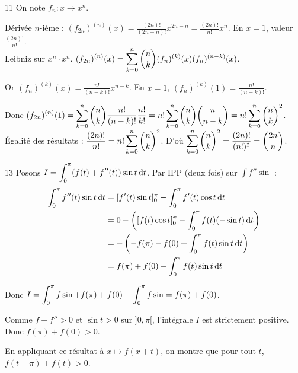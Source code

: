 \begin{correction}{11}
    On note $f_n: x \to x^n$.

    Dérivée $n$-ième : $(f_{2n})^{(n)}(x) = \frac{(2n)!}{(2n-n)!} x^{2n-n} = \frac{(2n)!}{n!} x^n$.
    En $x=1$, valeur $\frac{(2n)!}{n!}$. \\
    
    Leibniz sur $x^n \cdot x^n$.
    $\displaystyle(f_{2n})^{(n)}(x) = \sum_{k=0}^n \binom{n}{k} (f_n)^{(k)}(x) (f_n)^{(n-k)}(x)$.

    Or $(f_n)^{(k)}(x) = \frac{n!}{(n-k)!} x^{n-k}$.
    En $x=1$, $(f_n)^{(k)}(1) = \frac{n!}{(n-k)!}$.

    Donc $\displaystyle (f_{2n})^{(n)}(1) = \sum_{k=0}^n \binom{n}{k} \frac{n!}{(n-k)!} \frac{n!}{k!} = n! \sum_{k=0}^n \binom{n}{k} \binom{n}{n-k} = n! \sum_{k=0}^n \binom{n}{k}^2$. \\

    Égalité des résultats : $\displaystyle \frac{(2n)!}{n!} = n! \sum_{k=0}^n \binom{n}{k}^2$.
    D'où $\displaystyle \sum_{k=0}^n \binom{n}{k}^2 = \frac{(2n)!}{(n!)^2} = \binom{2n}{n}$.
\end{correction}

\begin{correction}{13}
    Posons $\displaystyle I = \int_0^\pi (f(t)+f''(t)) \sin t \,\mathrm{d} t$.
    Par IPP (deux fois) sur $\int f'' \sin$ :
    \begin{align*}
        \int_0^\pi f''(t) \sin t \,\mathrm{d} t &= [f'(t)\sin t]_0^\pi - \int_0^\pi f'(t) \cos t \,\mathrm{d}t \\
        &= 0 - \left([f(t)\cos t]_0^\pi - \int_0^\pi f(t)(-\sin t)\,\mathrm{d}t\right) \\
        &= - \left(-f(\pi) - f(0) + \int_0^\pi f(t) \sin t \,\mathrm{d}t\right) \\
        &= f(\pi)+f(0) - \int_0^\pi f(t) \sin t \,\mathrm{d}t
    \end{align*}
    
    Donc $\displaystyle I = \int_0^{\pi} f \sin + f(\pi)+f(0) - \int_0^{\pi} f \sin = f(\pi)+f(0)$.

    Comme $f+f''>0$ et $\sin t > 0$ sur $]0,\pi[$, l'intégrale $I$ est strictement positive.
    Donc $f(\pi)+f(0) > 0$.

    En appliquant ce résultat à $x \mapsto f(x+t)$, on montre que pour tout $t$, $f(t+\pi)+f(t) > 0$.
\end{correction}

